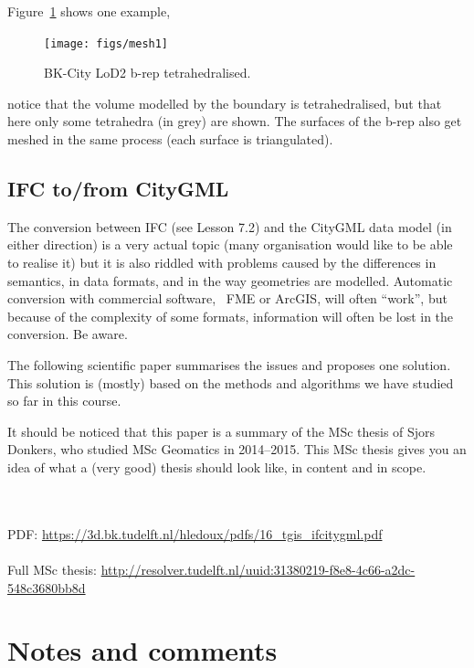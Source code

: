 Figure~\ref{fig:meshing} shows one example,
\begin{figure}
  \centering
  \texttt{[image: figs/mesh1]}
  \caption{BK-City LoD2 b-rep tetrahedralised.}%
\label{fig:meshing}
\end{figure}
notice that the volume modelled by the boundary is tetrahedralised, but that here only some tetrahedra (in grey) are shown. 
The surfaces of the b-rep also get meshed in the same process (each surface is triangulated).


\subsection{IFC to/from CityGML}

The conversion between IFC (see Lesson 7.2) and the CityGML data model (in either direction) is a very actual topic (many organisation would like to be able to realise it) but it is also riddled with problems caused by the differences in semantics, in data formats, and in the way geometries are modelled.
Automatic conversion with commercial software, \eg\ FME or ArcGIS, will often ``work'', but because of the complexity of some formats, information will often be lost in the conversion. 
Be aware.

The following scientific paper summarises the issues and proposes one solution. 
This solution is (mostly) based on the methods and algorithms we have studied so far in this course.

It should be noticed that this paper is a summary of the MSc thesis of Sjors Donkers, who studied MSc Geomatics in 2014--2015.
This MSc thesis gives you an idea of what a (very good) thesis should look like, in content and in scope.

\begin{kaobox}[frametitle=\faExternalLink\ To read or to watch.]
  \\ \\
  PDF: \url{https://3d.bk.tudelft.nl/hledoux/pdfs/16_tgis_ifcitygml.pdf}
  \\ \\
  Full MSc thesis: \url{http://resolver.tudelft.nl/uuid:31380219-f8e8-4c66-a2dc-548c3680bb8d}
\end{kaobox}

%
\section{Notes and comments}

